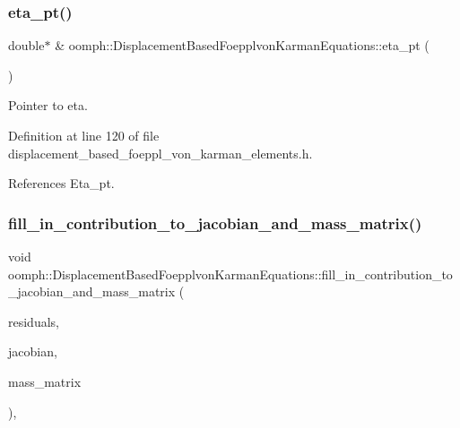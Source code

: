 \subsubsection{\texorpdfstring{eta\+\_\+pt()}{eta\_pt()}}
{\footnotesize\ttfamily double$\ast$ \& oomph\+::\+Displacement\+Based\+Foepplvon\+Karman\+Equations\+::eta\+\_\+pt (\begin{DoxyParamCaption}{ }\end{DoxyParamCaption})\hspace{0.3cm}{\ttfamily [inline]}}



Pointer to eta. 



Definition at line 120 of file displacement\+\_\+based\+\_\+foeppl\+\_\+von\+\_\+karman\+\_\+elements.\+h.



References Eta\+\_\+pt.

\mbox{\label{classoomph_1_1DisplacementBasedFoepplvonKarmanEquations_a9c6a54fd6c46014805f5d3d55220e35b}} 
\subsubsection{\texorpdfstring{fill\+\_\+in\+\_\+contribution\+\_\+to\+\_\+jacobian\+\_\+and\+\_\+mass\+\_\+matrix()}{fill\_in\_contribution\_to\_jacobian\_and\_mass\_matrix()}}
{\footnotesize\ttfamily void oomph\+::\+Displacement\+Based\+Foepplvon\+Karman\+Equations\+::fill\+\_\+in\+\_\+contribution\+\_\+to\+\_\+jacobian\+\_\+and\+\_\+mass\+\_\+matrix (\begin{DoxyParamCaption}\item[{\hyperlink{classoomph_1_1Vector}{Vector}$<$ double $>$ \&}]{residuals,  }\item[{\hyperlink{classoomph_1_1DenseMatrix}{Dense\+Matrix}$<$ double $>$ \&}]{jacobian,  }\item[{\hyperlink{classoomph_1_1DenseMatrix}{Dense\+Matrix}$<$ double $>$ \&}]{mass\+\_\+matrix }\end{DoxyParamCaption})\hspace{0.3cm}{\ttfamily [inline]}, {\ttfamily [virtual]}}



